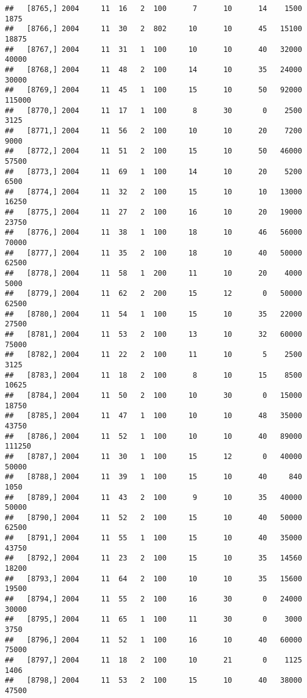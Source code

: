 \documentclass{article}\usepackage[]{graphicx}\usepackage[]{color}
\makeatletter
\newenvironment{kframe}{%
 \def\at@end@of@kframe{}%
 \ifinner\ifhmode%
  \def\at@end@of@kframe{\end{minipage}}%
  \begin{minipage}{\columnwidth}%
 \fi\fi%
 \def\FrameCommand##1{\hskip\@totalleftmargin \hskip-\fboxsep
 \colorbox{shadecolor}{##1}\hskip-\fboxsep
     \hskip-\linewidth \hskip-\@totalleftmargin \hskip\columnwidth}%
 \MakeFramed {\advance\hsize-\width
   \@totalleftmargin\z@ \linewidth\hsize
   \@setminipage}}%
 {\par\unskip\endMakeFramed%
 \at@end@of@kframe}
\newenvironment{knitrout}{}{} %
\makeatother
\begin{document}
\begin{knitrout}
\begin{kframe}
\begin{verbatim}
##   [8765,] 2004     11  16   2  100      7      10      14    1500    1875
##   [8766,] 2004     11  30   2  802     10      10      45   15100   18875
##   [8767,] 2004     11  31   1  100     10      10      40   32000   40000
##   [8768,] 2004     11  48   2  100     14      10      35   24000   30000
##   [8769,] 2004     11  45   1  100     15      10      50   92000  115000
##   [8770,] 2004     11  17   1  100      8      30       0    2500    3125
##   [8771,] 2004     11  56   2  100     10      10      20    7200    9000
##   [8772,] 2004     11  51   2  100     15      10      50   46000   57500
##   [8773,] 2004     11  69   1  100     14      10      20    5200    6500
##   [8774,] 2004     11  32   2  100     15      10      10   13000   16250
##   [8775,] 2004     11  27   2  100     16      10      20   19000   23750
##   [8776,] 2004     11  38   1  100     18      10      46   56000   70000
##   [8777,] 2004     11  35   2  100     18      10      40   50000   62500
##   [8778,] 2004     11  58   1  200     11      10      20    4000    5000
##   [8779,] 2004     11  62   2  200     15      12       0   50000   62500
##   [8780,] 2004     11  54   1  100     15      10      35   22000   27500
##   [8781,] 2004     11  53   2  100     13      10      32   60000   75000
##   [8782,] 2004     11  22   2  100     11      10       5    2500    3125
##   [8783,] 2004     11  18   2  100      8      10      15    8500   10625
##   [8784,] 2004     11  50   2  100     10      30       0   15000   18750
##   [8785,] 2004     11  47   1  100     10      10      48   35000   43750
##   [8786,] 2004     11  52   1  100     10      10      40   89000  111250
##   [8787,] 2004     11  30   1  100     15      12       0   40000   50000
##   [8788,] 2004     11  39   1  100     15      10      40     840    1050
##   [8789,] 2004     11  43   2  100      9      10      35   40000   50000
##   [8790,] 2004     11  52   2  100     15      10      40   50000   62500
##   [8791,] 2004     11  55   1  100     15      10      40   35000   43750
##   [8792,] 2004     11  23   2  100     15      10      35   14560   18200
##   [8793,] 2004     11  64   2  100     10      10      35   15600   19500
##   [8794,] 2004     11  55   2  100     16      30       0   24000   30000
##   [8795,] 2004     11  65   1  100     11      30       0    3000    3750
##   [8796,] 2004     11  52   1  100     16      10      40   60000   75000
##   [8797,] 2004     11  18   2  100     10      21       0    1125    1406
##   [8798,] 2004     11  53   2  100     15      10      40   38000   47500

\end{verbatim}
\end{kframe}
\end{knitrout}
\end{document}

